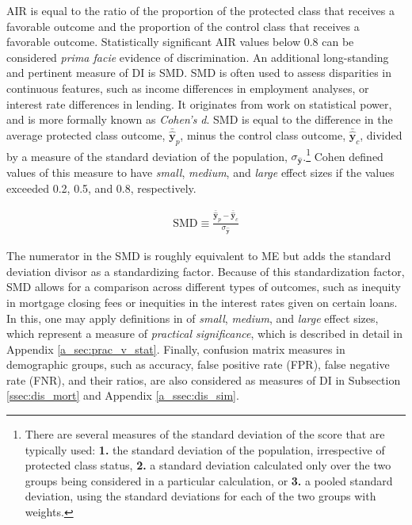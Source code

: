 \documentclass[information,article,submit,moreauthors,pdftex]{definitions/mdpi}
\begin{document}
\noindent AIR is equal to the ratio of the proportion of the protected class that receives a favorable outcome and the proportion of the control class that receives a favorable outcome. Statistically significant AIR values below 0.8 can be considered \textit{prima facie} evidence of discrimination. An additional long-standing and pertinent measure of DI is SMD. SMD is often used to assess disparities in continuous features, such as income differences in employment analyses, or interest rate differences in lending. It originates from work on statistical power, and is more formally known as \textit{Cohen’s d}. SMD is equal to the difference in the average protected class outcome, $\bar{\hat{\mathbf{y}}}_p$, minus the control class outcome, $\bar{\hat{\mathbf{y}}}_c$, divided by a measure of the standard deviation of the population, $\sigma_{\hat{\mathbf{y}}}$.\footnote{There are several measures of the standard deviation of the score that are typically used: \textbf{1.} the standard deviation of the population, irrespective of protected class status, \textbf{2.} a standard deviation calculated only over the two groups being considered in a particular calculation, or \textbf{3.} a pooled standard deviation, using the standard deviations for each of the two groups with weights.} Cohen defined values of this measure to have \textit{small}, \textit{medium}, and \textit{large} effect sizes if the values exceeded 0.2, 0.5, and 0.8, respectively.  

\begin{equation}
\label{eq:smd}
\begin{aligned}
\text{SMD} \equiv \frac{\bar{\hat{\mathbf{y}}}_p - \bar{\hat{\mathbf{y}}}_c}{ \sigma_{\hat{\mathbf{y}}}}
\end{aligned}
\end{equation}

\noindent The numerator in the SMD is roughly equivalent to ME but adds the standard deviation divisor as a standardizing factor.  Because of this standardization factor, SMD allows for a comparison across different types of outcomes, such as inequity in mortgage closing fees or inequities in the interest rates given on certain loans.  In this, one may apply definitions in \citet{cohen1988statistical} of \textit{small}, \textit{medium}, and \textit{large} effect sizes, which represent a measure of \textit{practical significance}, which is described in detail in Appendix \ref{a_sec:prac_v_stat}. Finally, confusion matrix measures in demographic groups, such as accuracy, false positive rate (FPR), false negative rate (FNR), and their ratios, are also considered as measures of DI in Subsection \ref{ssec:dis_mort} and Appendix \ref{a_ssec:dis_sim}.
\end{document}
